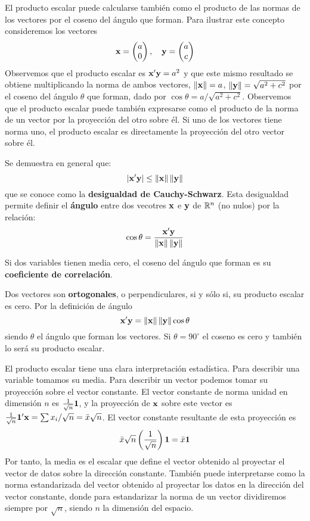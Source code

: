 El producto escalar puede calcularse también como el producto de las normas de los vectores por el coseno del ángulo que forman. Para ilustrar este concepto consideremos los vectores
$$\mathbf{x}=\begin{pmatrix}
    a \\
    0
\end{pmatrix}, \quad \mathbf{y}=\begin{pmatrix}
    a \\
    c
\end{pmatrix}$$
Observemos que el producto escalar es $\mathbf{x}'\mathbf{y}=a^2$ y que este mismo resultado se obtiene multiplicando la norma de ambos vectores, $\left\| \mathbf{x}\right\|=a$, $\left\| \mathbf{y}\right\|=\sqrt{a^2+c^2}$ por el coseno del ángulo $\theta$ que forman, dado por $\cos\theta=a/\sqrt{a^2+c^2}$. Observemos que el producto escalar puede también expresarse como el producto de la norma de un vector por la proyección del otro sobre él. Si uno de los vectores tiene norma uno, el producto escalar es directamente la proyección del otro vector sobre él.

Se demuestra en general que:
$$\left| \mathbf{x}'\mathbf{y}\right|\leq\left\| \mathbf{x}\right\|\left\| \mathbf{y}\right\|$$
que se conoce como la \textbf{desigualdad de Cauchy-Schwarz}. Esta desigualdad permite definir el \textbf{ángulo} entre dos vecotres $\mathbf{x}$ e $\mathbf{y}$ de $\mathbb{R}^n$ (no nulos) por la relación:
$$\cos\theta=\frac{\mathbf{x}'\mathbf{y}}{\left\| \mathbf{x}\right\|\left\| \mathbf{y}\right\|}$$

Si dos variables tienen media cero, el coseno del ángulo que forman es su \textbf{coeficiente de correlación}.

Dos vectores son \textbf{ortogonales}, o perpendiculares, si y sólo si, su producto escalar es cero. Por la definición de ángulo
$$\mathbf{x}'\mathbf{y}=\left\| \mathbf{x}\right\|\left\| \mathbf{y}\right\|\cos\theta$$
siendo $\theta$ el ángulo que forman los vectores. Si $\theta=90^\circ$ el coseno es cero y también lo será su producto escalar.

El producto escalar tiene una clara interpretación estadística. Para describir una variable tomamos su media. Para describir un vector podemos tomar su proyección sobre el vector constante. El vector constante de norma unidad en dimensión $n$ es $\frac{1}{\sqrt{n}}\mathbf{1}$, y la proyección de $\mathbf{x}$ sobre este vector es $\frac{1}{\sqrt{n}}\mathbf{1}'\mathbf{x}=\sum x_i/\sqrt{n}=\bar{x}\sqrt{n}$. El vector constante resultante de esta proyección es
$$\bar{x}\sqrt{n}\left(\frac{1}{\sqrt{n}}\right)\mathbf{1}=\bar{x}\mathbf{1}$$
Por tanto, la media es el escalar que define el vector obtenido al proyectar el vector de datos sobre la dirección constante. También puede interpretarse como la norma estandarizada del vector obtenido al proyectar los datos en la dirección del vector constante, donde para estandarizar la norma de un vector dividiremos siempre por $\sqrt{n}$, siendo $n$ la dimensión del espacio.

